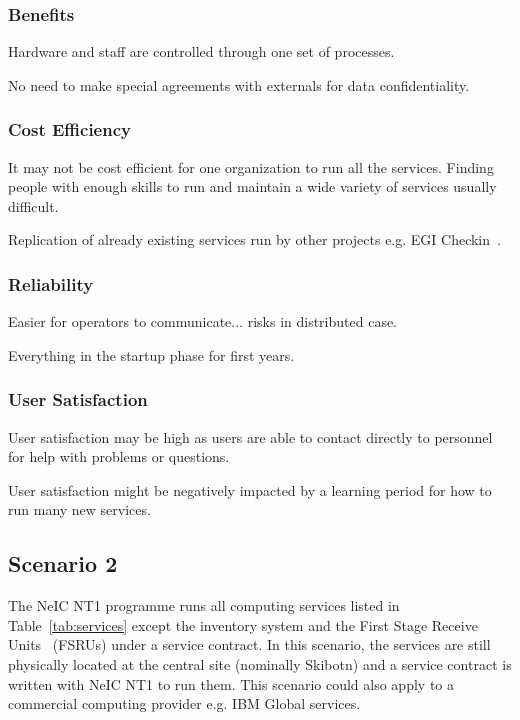 \documentclass[12pt,a4paper]{article}
\newcommand{\nnt}{NeIC NT1\xspace}
\begin{document}
\subsubsection*{Benefits}
\bitm
\item Hardware and staff are controlled through one set of \EC processes.
\item No need to make special agreements with externals for data confidentiality.
\eitm

\subsubsection*{Cost Efficiency}
\bitm
\item It may not be cost efficient for one organization to run all the services. Finding people with enough skills to run and maintain a wide variety of services usually difficult.
\item Replication of already existing services run by other \einfra projects e.g. EGI Checkin~\cite{egi-checkin}.
\eitm

\subsubsection*{Reliability}
\bitm
\item Easier for operators to communicate... risks in distributed case.
\item Everything in the startup phase for first years.
\eitm

\subsubsection*{User Satisfaction}
\bitm
\item User satisfaction may be high as users are able to contact directly to \EC personnel for help with problems or questions.
\item User satisfaction might be negatively impacted by a learning period for how to run many new services.
\eitm


\subsection{Scenario 2}
\label{ssec:scen2}

The \nnt programme runs all computing services listed in Table~\ref{tab:services} except the \ED inventory system
and the First Stage Receive Units~\cite{fsru-tender} (FSRUs) under a service contract.
In this scenario, the services are still physically located at the central site (nominally Skibotn) and a
service contract is written with \nnt to run them.
This scenario could also apply to a commercial computing provider e.g. IBM Global services.
\end{document}
